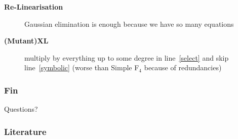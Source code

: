 \documentclass[9pt]{beamer}
\begin{document}
\begin{frame}
{\small
\begin{description}
 \item[\bf Re-Linearisation] Gaussian elimination is enough because we have so many equations
 \item[\bf (Mutant)XL] multiply by everything up to some degree in line~\ref{select} and skip line~\ref{symbolic} (worse than Simple F$_4$ because of redundancies)
\end{description}}

 
\end{frame}


\begin{frame}
\frametitle{Fin}
\begin{center}
\large{Questions?}
\end{center}
\end{frame}

\begin{frame}[allowframebreaks]
\frametitle{Literature}

 
\end{frame}
\end{document}
